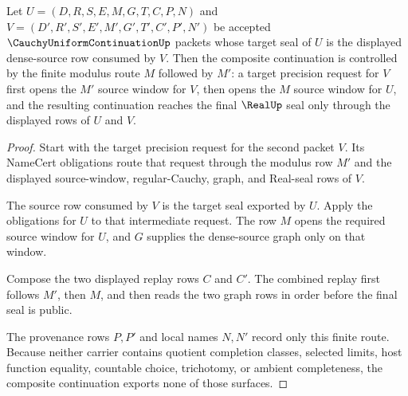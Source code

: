 \begin{theorem}
\label{thm:cauchy-uniform-continuation-modulus-composition}
Let $U=(D,R,S,E,M,G,T,C,P,N)$ and $V=(D',R',S',E',M',G',T',C',P',N')$ be accepted $\CauchyUniformContinuationUp$ packets whose target seal of $U$ is the displayed dense-source row consumed by $V$. Then the composite continuation is controlled by the finite modulus route $M$ followed by $M'$: a target precision request for $V$ first opens the $M'$ source window for $V$, then opens the $M$ source window for $U$, and the resulting continuation reaches the final $\RealUp$ seal only through the displayed rows of $U$ and $V$.
\end{theorem}
\begin{proof}
Start with the target precision request for the second packet $V$. Its NameCert obligations route that request through the modulus row $M'$ and the displayed source-window, regular-Cauchy, graph, and Real-seal rows of $V$.

The source row consumed by $V$ is the target seal exported by $U$. Apply the obligations for $U$ to that intermediate request. The row $M$ opens the required source window for $U$, and $G$ supplies the dense-source graph only on that window.

Compose the two displayed replay rows $C$ and $C'$. The combined replay first follows $M'$, then $M$, and then reads the two graph rows in order before the final seal is public.

The provenance rows $P,P'$ and local names $N,N'$ record only this finite route. Because neither carrier contains quotient completion classes, selected limits, host function equality, countable choice, trichotomy, or ambient completeness, the composite continuation exports none of those surfaces.
\end{proof}


\begin{closurestatus}{\CauchyUniformContinuationUp}
  \theoryclosure{\seedClosure}
  \formalstatus{\unformalizedV}
\end{closurestatus}
